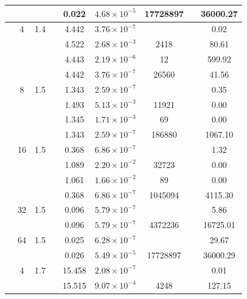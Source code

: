 \begin{table}[htbp]
\begin{tabular}{l S[table-format=3.0] S[table-format=4.1] l S[table-format=3.3] S[table-format=1.2e2] S[table-format=6.0] S[table-format=2.0] S[table-format=4.2]}
     &  &  &  & 0.022 & $4.68 \times 10^{-5}$ & 17728897 & {\text{---}} & 36000.27 \\
    \midrule
     & 4 & 1.4 &  & 4.442 & $3.76 \times 10^{-7}$ & {\text{---}} & {\text{---}} & 0.02 \\
     &  &  &  & 4.522 & $2.68 \times 10^{-3}$ & 2418 & {\text{---}} & 80.61 \\
     &  &  &  & 4.443 & $2.19 \times 10^{-6}$ & 12 & {\text{---}} & 599.92 \\
     &  &  &  & 4.442 & $3.76 \times 10^{-7}$ & 26560 & {\text{---}} & 41.56 \\
     & 8 & 1.5 &  & 1.343 & $2.59 \times 10^{-7}$ & {\text{---}} & {\text{---}} & 0.35 \\
     &  &  &  & 1.493 & $5.13 \times 10^{-3}$ & 11921 & {\text{---}} & 0.00 \\
     &  &  &  & 1.345 & $1.71 \times 10^{-3}$ & 69 & {\text{---}} & 0.00 \\
     &  &  &  & 1.343 & $2.59 \times 10^{-7}$ & 186880 & {\text{---}} & 1067.10 \\
     & 16 & 1.5 &  & 0.368 & $6.86 \times 10^{-7}$ & {\text{---}} & {\text{---}} & 1.32 \\
     &  &  &  & 1.089 & $2.20 \times 10^{-2}$ & 32723 & {\text{---}} & 0.00 \\
     &  &  &  & 1.061 & $1.66 \times 10^{-2}$ & 89 & {\text{---}} & 0.00 \\
     &  &  &  & 0.368 & $6.86 \times 10^{-7}$ & 1045094 & {\text{---}} & 4115.30 \\
     & 32 & 1.5 &  & 0.096 & $5.79 \times 10^{-7}$ & {\text{---}} & {\text{---}} & 5.86 \\
     &  &  &  & 0.096 & $5.79 \times 10^{-7}$ & 4372236 & {\text{---}} & 16725.01 \\
     & 64 & 1.5 &  & 0.025 & $6.28 \times 10^{-7}$ & {\text{---}} & {\text{---}} & 29.67 \\
     &  &  &  & 0.026 & $5.49 \times 10^{-5}$ & 17728897 & {\text{---}} & 36000.29 \\
    \midrule
     & 4 & 1.7 &  & 15.458 & $2.08 \times 10^{-7}$ & {\text{---}} & {\text{---}} & 0.01 \\
     &  &  &  & 15.515 & $9.07 \times 10^{-4}$ & 4248 & {\text{---}} & 127.15 \\

\end{tabular}
\end{table}
